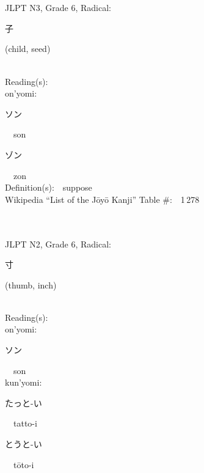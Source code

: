 \begin{multicols}{2}
\ \ \\
{\fontsize{34pt}{40pt}  }\ \ \\  %
{JLPT N3, Grade 6, Radical:\ \ {\begin{CJK}{UTF8}{min} 子 \end{CJK}} (child, seed) } \\
Reading(s):\ \ \\
{\hspace*{1em}}on'yomi:\ \ \\
{\hspace*{2em}}{\begin{CJK}{UTF8}{min} ソン \end{CJK}}\ \ son\ \ \\
{\hspace*{2em}}{\begin{CJK}{UTF8}{min} ゾン \end{CJK}}\ \ zon\ \ \\
Definition(s):\ \ suppose \\
Wikipedia ``List of the J\=oy\=o Kanji'' Table \#:\ \ 1\,278 \\
\ \ \\
{\fontsize{34pt}{40pt}  }\ \ \\  %
{JLPT N2, Grade 6, Radical:\ \ {\begin{CJK}{UTF8}{min} 寸 \end{CJK}} (thumb, inch) } \\
Reading(s):\ \ \\
{\hspace*{1em}}on'yomi:\ \ \\
{\hspace*{2em}}{\begin{CJK}{UTF8}{min} ソン \end{CJK}}\ \ son\ \ \\
{\hspace*{1em}}kun'yomi:\ \ \\
{\hspace*{2em}}{\begin{CJK}{UTF8}{min} たっと-い \end{CJK}}\ \ tatto-i\ \ \\
{\hspace*{2em}}{\begin{CJK}{UTF8}{min} とうと-い \end{CJK}}\ \ t\=oto-i\ \ \\

\end{multicols}
